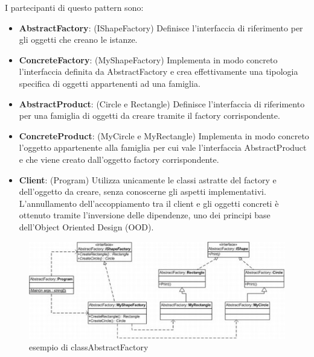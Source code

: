 \documentclass[a4paper,10pt]{article}
\begin{document}
                    I partecipanti di questo pattern sono:
                            
                    \begin{itemize}
                        \item \textbf{AbstractFactory}: (IShapeFactory) Definisce l’interfaccia di riferimento per gli oggetti che creano le istanze.
                        \item \textbf{ConcreteFactory}: (MyShapeFactory) Implementa in modo concreto l’interfaccia definita da AbstractFactory e crea effettivamente una tipologia specifica di oggetti appartenenti ad una famiglia.
                        \item \textbf{AbstractProduct}: (Circle e Rectangle) Definisce l’interfaccia di riferimento per una famiglia di oggetti da creare tramite il factory corrispondente.
                        \item \textbf{ConcreteProduct}: (MyCircle e MyRectangle) Implementa in modo concreto l’oggetto appartenente alla famiglia per cui vale l’interfaccia AbstractProduct e che viene creato dall’oggetto factory corrispondente.
                        \item \textbf{Client}: (Program) Utilizza unicamente le classi astratte del factory e dell’oggetto da creare, senza conoscerne gli aspetti implementativi. L’annullamento dell’accoppiamento tra il client e gli oggetti concreti è ottenuto tramite l’inversione delle dipendenze, uno dei principi base dell’Object Oriented Design (OOD).
                    \end{itemize}
                    
                    \begin{figure}[h!] %
                        \centering
                        \includegraphics[scale=0.75]{img/IC130807}	
                        \caption{esempio di classAbstractFactory}
                    \end{figure}
            
\end{document}
